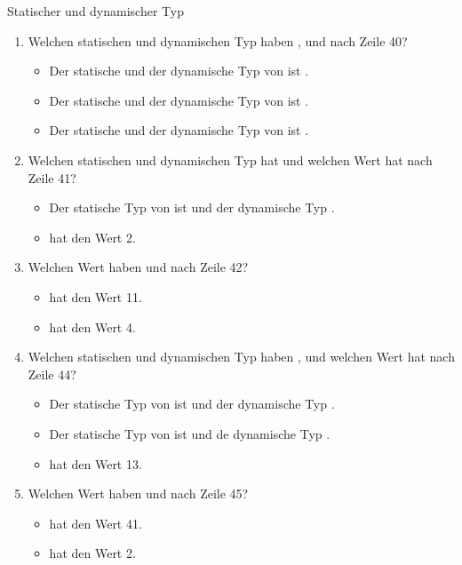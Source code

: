 \documentclass{../tuda-exercise}
\begin{document}
\begin{task}[credit=\stars{2}{3}]{Statischer und dynamischer Typ}
    \begin{solution}
      \begin{enumerate}
        [label=(\arabic*)]
        \item Welchen statischen und dynamischen Typ haben ,  und
         nach Zeile 40?
        \begin{itemize}
          \item Der statische und der dynamische Typ von  ist .
          \item Der statische und der dynamische Typ von  ist .
          \item Der statische und der dynamische Typ von  ist .
        \end{itemize}
        \item Welchen statischen und dynamischen Typ hat  und welchen Wert hat
         nach Zeile 41?
        \begin{itemize}
          \item Der statische Typ von  ist  und der dynamische
          Typ .
          \item {} hat den Wert 2.
        \end{itemize}
        \item Welchen Wert haben  und  nach Zeile 42?
        \begin{itemize}
          \item {} hat den Wert 11.
          \item {} hat den Wert 4.
        \end{itemize}
        \item Welchen statischen und dynamischen Typ haben ,  und
        welchen Wert hat
         nach Zeile 44?
        \begin{itemize}
          \item Der statische Typ von  ist  und der dynamische
          Typ .
          \item Der statische Typ von  ist  und de dynamische Typ
          .
          \item {} hat den Wert 13.
        \end{itemize}
        \item Welchen Wert haben  und  nach Zeile 45?
        \begin{itemize}
          \item {} hat den Wert 41.
          \item {} hat den Wert 2.
        \end{itemize}
      \end{enumerate}


\end{solution}
\end{task}
\end{document}
